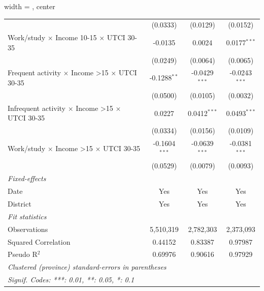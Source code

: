 \begin{table}[htbp]
\begin{adjustbox}{width = \textwidth, center}
\begin{tabular}{lccc}
                                                                         & (0.0333)                  & (0.0129)                & (0.0152)\\   
         Work/study $\times$ Income 10-15 $\times$ UTCI 30-35            & -0.0135                   & 0.0024                  & 0.0177$^{***}$\\   
                                                                         & (0.0249)                  & (0.0064)                & (0.0065)\\   
         Frequent activity $\times$ Income >15 $\times$ UTCI 30-35       & -0.1288$^{**}$            & -0.0429$^{***}$         & -0.0243$^{***}$\\   
                                                                         & (0.0500)                  & (0.0105)                & (0.0032)\\   
         Infrequent activity $\times$ Income >15 $\times$ UTCI 30-35     & 0.0227                    & 0.0412$^{***}$          & 0.0493$^{***}$\\   
                                                                         & (0.0334)                  & (0.0156)                & (0.0109)\\   
         Work/study $\times$ Income >15 $\times$ UTCI 30-35              & -0.1604$^{***}$           & -0.0639$^{***}$         & -0.0381$^{***}$\\   
                                                                         & (0.0529)                  & (0.0079)                & (0.0093)\\   
         \midrule
         \emph{Fixed-effects}\\
         Date                                                            & Yes                       & Yes                     & Yes\\  
         District                                                        & Yes                       & Yes                     & Yes\\  
         \midrule
         \emph{Fit statistics}\\
         Observations                                                    & 5,510,319                 & 2,782,303               & 2,373,093\\  
         Squared Correlation                                             & 0.44152                   & 0.83387                 & 0.97987\\  
         Pseudo R$^2$                                                    & 0.69976                   & 0.90616                 & 0.97929\\  
         \midrule \midrule
         \multicolumn{4}{l}{\emph{Clustered (province) standard-errors in parentheses}}\\
         \multicolumn{4}{l}{\emph{Signif. Codes: ***: 0.01, **: 0.05, *: 0.1}}\\
      \end{tabular}
   \end{adjustbox}
\end{table}


